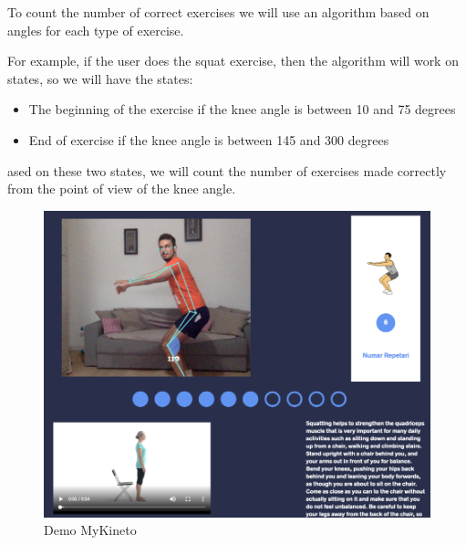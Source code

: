 To count the number of correct exercises we will use an algorithm based on angles for each type of exercise.

For example, if the user does the squat exercise, then the algorithm will work on states, so we will have the states:
\begin{itemize}
    \item The beginning of the exercise if the knee angle is between 10 and 75 degrees
    \item End of exercise if the knee angle is between 145 and 300 degrees
\end{itemize}

ased on these two states, we will count the number of exercises made correctly from the point of view of the knee angle.

 \begin{figure}[htbp]
	\centerline{\includegraphics[scale=0.7]{fig/demo-mykineto.png}}  
	\caption{Demo MyKineto}
	\label{fig:demo-web-mykineto}
\end{figure}

